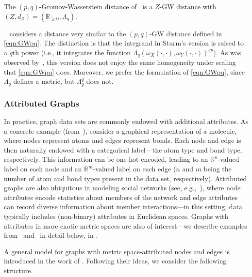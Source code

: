 \documentclass[twoside,11pt]{article}
\theoremstyle{definition}
\newcommand{\R}{\mathbb{R}}
\begin{document}
\begin{proposition}\label{prop:pqGWasZGW}
    The $(p,q)$-Gromov-Wasserstein distance of~\citet{arya2023gromov} is a $Z$-GW distance with $(Z,d_Z) = (\R_{\geq 0}, \Lambda_q)$. 
\end{proposition}


\begin{remark}\label{rem:comparison_to_sturm}
    ~\citet{sturm2023space} considers a distance very similar to the $(p,q)$-GW distance defined in \eqref{eqn:GWpq}. The distinction is that the integrand in Sturm's version is raised to a $q$th power (i.e., it integrates the function $\Lambda_q(\omega_X(\cdot,\cdot),\omega_Y(\cdot,\cdot))^{qp}$). As was observed by~\citet{arya2023gromov}, this version does not enjoy the same homogeneity under scaling that \eqref{eqn:GWpq} does. Moreover, we prefer the formulation of \eqref{eqn:GWpq}, since $\Lambda_q$ defines a metric, but $\Lambda_q^q$ does not. 
\end{remark}

\subsubsection{Attributed Graphs}\label{sec:attributed_graphs}

In practice, graph data sets are commonly endowed with additional attributes. As a concrete example (from~\citealt{kawano2024multi}), consider a graphical representation of a molecule, where nodes represent atoms and edges represent bonds. Each node and edge is then naturally endowed with a categorical label---the atom type and bond type, respectively. This information can be one-hot encoded, leading to an $\R^n$-valued label on each node and an $\R^m$-valued label on each edge ($n$ and $m$ being the number of atom and bond types present in the data set, respectively). Attributed graphs are also ubiquitous in modeling social networks (see, e.g.,~\citealp{bothorel2015clustering}), where node attributes encode statistics about members of the network and edge attributes can record diverse information about member interactions---in this setting, data typically includes (non-binary) attributes in Euclidean spaces. Graphs with attributes in more exotic metric spaces are also of interest---we describe examples from~\citet{bal2022statistical} and~\citet{robertson2023generalization} in detail below, in . 

A general model for graphs with metric space-attributed nodes and edges is introduced in the work of \citet{yang2023exploiting}. Following their ideas, we consider the following structure.
\end{document}
